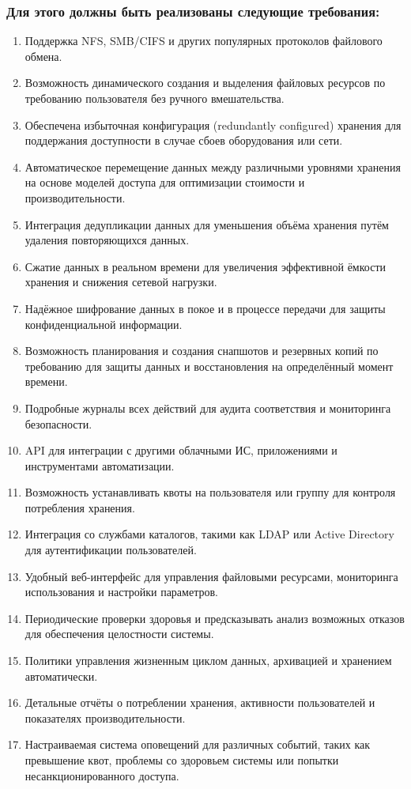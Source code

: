 \documentclass[14pt, a4paper]{extarticle}
\begin{document}
\subsubsection*{Для этого должны быть реализованы следующие требования:}

\begin{enumerate}
\item Поддержка NFS, SMB/CIFS и других популярных протоколов файлового обмена.
\item Возможность динамического создания и выделения файловых ресурсов по требованию пользователя без ручного вмешательства.
\item Обеспечена избыточная конфигурация (redundantly configured) хранения для поддержания доступности в случае сбоев оборудования или сети.
\item Автоматическое перемещение данных между различными уровнями хранения на основе моделей доступа для оптимизации стоимости и производительности.
\item Интеграция дедупликации данных для уменьшения объёма хранения путём удаления повторяющихся данных.
\item Сжатие данных в реальном времени для увеличения эффективной ёмкости хранения и снижения сетевой нагрузки.
\item Надёжное шифрование данных в покое и в процессе передачи для защиты конфиденциальной информации.
\item Возможность планирования и создания снапшотов и резервных копий по требованию для защиты данных и восстановления на определённый момент времени.
\item Подробные журналы всех действий для аудита соответствия и мониторинга безопасности.
\item API для интеграции с другими облачными ИС, приложениями и инструментами автоматизации.
\item Возможность устанавливать квоты на пользователя или группу для контроля потребления хранения.
\item Интеграция со службами каталогов, такими как LDAP или Active Directory для аутентификации пользователей.
\item Удобный веб-интерфейс для управления файловыми ресурсами, мониторинга использования и настройки параметров.
\item Периодические проверки здоровья и предсказывать анализ возможных отказов для обеспечения целостности системы.
\item Политики управления жизненным циклом данных, архивацией и хранением автоматически.
\item Детальные отчёты о потреблении хранения, активности пользователей и показателях производительности.
\item Настраиваемая система оповещений для различных событий, таких как превышение квот, проблемы со здоровьем системы или попытки несанкционированного доступа.
\end{enumerate}
\end{document}
